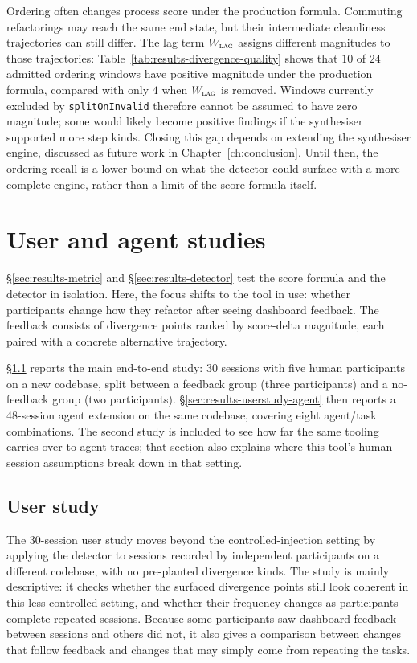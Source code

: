 Ordering often changes process score under the production formula. Commuting refactorings may reach the same end state, but their intermediate cleanliness trajectories can still differ. The lag term $W_{\textsc{lag}}$ assigns different magnitudes to those trajectories: Table~\ref{tab:results-divergence-quality} shows that $10$ of $24$ admitted ordering windows have positive magnitude under the production formula, compared with only $4$ when $W_{\textsc{lag}}$ is removed. Windows currently excluded by \texttt{splitOnInvalid} therefore cannot be assumed to have zero magnitude; some would likely become positive findings if the synthesiser supported more step kinds. Closing this gap depends on extending the synthesiser engine, discussed as future work in Chapter~\ref{ch:conclusion}. Until then, the ordering recall is a lower bound on what the detector could surface with a more complete engine, rather than a limit of the score formula itself.

\section{User and agent studies}
\label{sec:results-studies}

\S\ref{sec:results-metric} and \S\ref{sec:results-detector} test the score formula and the detector in isolation. Here, the focus shifts to the tool in use: whether participants change how they refactor after seeing dashboard feedback. The feedback consists of divergence points ranked by score-delta magnitude, each paired with a concrete alternative trajectory.

\S\ref{sec:results-userstudy} reports the main end-to-end study: $30$ sessions with five human participants on a new codebase, split between a feedback group (three participants) and a no-feedback group (two participants). \S\ref{sec:results-userstudy-agent} then reports a 48-session agent extension on the same codebase, covering eight agent/task combinations. The second study is included to see how far the same tooling carries over to agent traces; that section also explains where this tool's human-session assumptions break down in that setting.

\subsection{User study}
\label{sec:results-userstudy}

The 30-session user study moves beyond the controlled-injection setting by applying the detector to sessions recorded by independent participants on a different codebase, with no pre-planted divergence kinds. The study is mainly descriptive: it checks whether the surfaced divergence points still look coherent in this less controlled setting, and whether their frequency changes as participants complete repeated sessions. Because some participants saw dashboard feedback between sessions and others did not, it also gives a comparison between changes that follow feedback and changes that may simply come from repeating the tasks.

